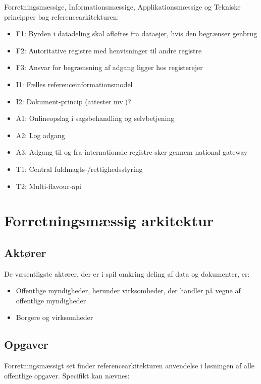 Forretningsmæssige, Informationsmæssige, Applikationsmæssige og Tekniske
principper bag referencearkitekturen:

\begin{itemize}
\tightlist
\item
  F1: Byrden i datadeling skal afløftes fra dataejer, hvis den begrænser
  genbrug
\item
  F2: Autoritative registre med henvisninger til andre registre
\item
  F3: Ansvar for begrænsning af adgang ligger hos registerejer
\item
  I1: Fælles referenceinformationsmodel
\item
  I2: Dokument-princip (attester mv.)?
\item
  A1: Onlineopslag i sagsbehandling og selvbetjening
\item
  A2: Log adgang
\item
  A3: Adgang til og fra internationale registre sker gennem national
  gateway
\item
  T1: Central fuldmagts-/rettighedsstyring
\item
  T2: Multi-flavour-api
\end{itemize}

\section{Forretningsmæssig
arkitektur}\label{forretningsmuxe6ssig-arkitektur}

\subsection{Aktører}\label{aktuxf8rer}

De væsentligste aktører, der er i spil omkring deling af data og
dokumenter, er:

\begin{itemize}
\tightlist
\item
  Offentlige myndigheder, herunder virksomheder, der handler på vegne af
  offentlige myndigheder
\item
  Borgere og virksomheder
\end{itemize}

\subsection{Opgaver}\label{opgaver}

Forretningsmæssigt set finder referencearkitekturen anvendelse i
løsningen af alle offentlige opgaver. Specifikt kan nævnes:

